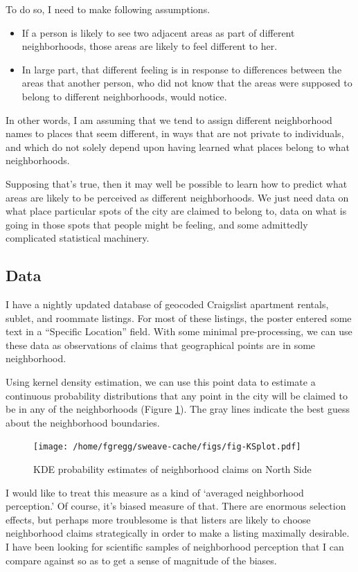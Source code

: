 \documentclass{article}
\begin{document}
To do so, I need to make following assumptions.

\begin{itemize}
\item If a person is likely to see two adjacent areas as part of
  different neighborhoods, those areas are likely to feel different to her.
\item In large part, that different feeling is in response to
  differences between the areas that another person, who did not know
  that the areas were supposed to belong to different neighborhoods,
  would notice.
\end{itemize}

In other words, I am assuming that we tend to assign different
neighborhood names to places that seem different, in ways that are
not private to individuals, and which do not solely depend upon having
learned what places belong to what neighborhoods.

Supposing that's true, then it may well be possible to learn how to
predict what areas are likely to be perceived as different
neighborhoods. We just need data on what place particular spots of the
city are claimed to belong to, data on what is going in those spots
that people might be feeling, and some admittedly complicated
statistical machinery.

\subsection*{Data}

I have a nightly updated database of geocoded Craigslist apartment
rentals, sublet, and roommate listings. For most of these listings,
the poster entered some text in a ``Specific Location'' field. With
some minimal pre-processing, we can use these data as observations of
claims that geographical points are in some neighborhood.

Using kernel density estimation, we can use this point data to
estimate a continuous probability distributions that any point in the
city will be claimed to be in any of the neighborhoods (Figure
\ref{fig:KDE}). The gray lines indicate the best guess about the
neighborhood boundaries.

\begin{figure}
\texttt{[image: /home/fgregg/sweave-cache/figs/fig-KSplot.pdf]}
\caption{KDE probability estimates of neighborhood claims on North Side}
\label{fig:KDE}
\end{figure}

I would like to treat this measure as a kind of `averaged neighborhood
perception.' Of course, it's biased measure of that. There are
enormous selection effects, but perhaps more troublesome is that
listers are likely to choose neighborhood claims strategically in
order to make a listing maximally desirable. I have been looking for
scientific samples of neighborhood perception that I can compare
against so as to get a sense of magnitude of the biases.
\end{document}
